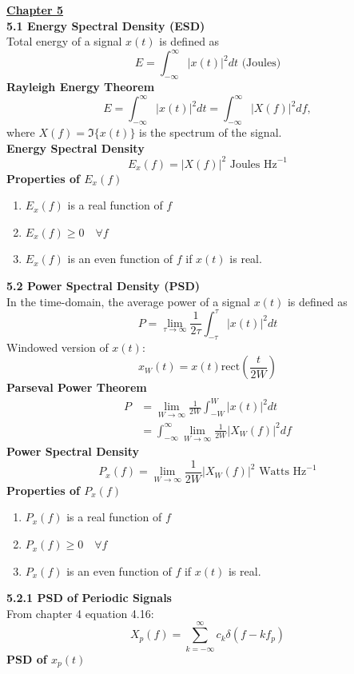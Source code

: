 \documentclass[6pt,landscape,a4paper]{extarticle}
\begin{document}
\begin{multicols*}{5}
    \textbf{\uline{Chapter 5}}\\
    \textbf{5.1 Energy Spectral Density (ESD)}\\
    Total energy of a signal $x(t)$ is defined as 
    \[
        E=\int_{-\infty}^{\infty}|x(t)|^2 dt \text{ (Joules)} \tag{5.1}
    \]
    \textbf{Rayleigh Energy Theorem}
    \[
        E=\int_{-\infty}^{\infty}|x(t)|^2dt=\int_{-\infty}^{\infty}|X(f)|^2df \tag{5.2},
    \]
    where $X(f)=\Im\{x(t)\}$ is the spectrum of the signal.\\
    \textbf{Energy Spectral Density}
    \[
        E_x(f)=|X(f)|^2 \text{ Joules Hz}^{-1}\tag{5.3}
    \]
    \textbf{Properties of $E_x(f)$}
    \begin{enumerate}
        \item $E_x(f)$ is a real function of $f$
        \item $E_x(f) \geq 0 \quad\forall f$
        \item $E_x(f)$ is an even function of $f$ if $x(t)$ is real.
    \end{enumerate}
    \textbf{5.2 Power Spectral Density (PSD)}\\
    In the time-domain, the average power of a signal $x(t)$ is defined as 
    \[
        P=\lim_{\tau \to \infty} \frac{1}{2\tau}\int_{-\tau}^{\tau}|x(t)|^2 dt \tag{5.4}
    \]
    Windowed version of $x(t)$:
    \[
        x_W(t)=x(t)\text{rect}(\frac{t}{2W}) \tag{5.5}
    \]
    \textbf{Parseval Power Theorem}
    \begin{align*}
        P&=\lim_{W \to \infty}\frac{1}{2W}\int_{-W}^{W}|x(t)|^2dt\\
        &=\int_{-\infty}^{\infty}\lim_{W \to \infty}\frac{1}{2W}|X_W(f)|^2df \tag{5.9}
    \end{align*}
    \textbf{Power Spectral Density}
    \[
        {P_x(f)=\lim_{W \to \infty}\frac{1}{2W}|X_W(f)|^2} \text{ Watts Hz}^{-1} \tag{5.10}
    \]
    \textbf{Properties of $P_x(f)$}
    \begin{enumerate}
        \item $P_x(f)$ is a real function of $f$
        \item $P_x(f) \geq 0 \quad \forall f$
        \item $P_x(f)$ is an even function of $f$ if $x(t)$ is real.
    \end{enumerate}
    \textbf{5.2.1 PSD of Periodic Signals}\\
    From chapter 4 equation 4.16:
    \[
        X_p(f)=\sum_{k=-\infty}^{\infty}c_k \delta (f-kf_p)
    \]
    \textbf{PSD of $x_p(t)$}

\end{multicols*}
\end{document}
